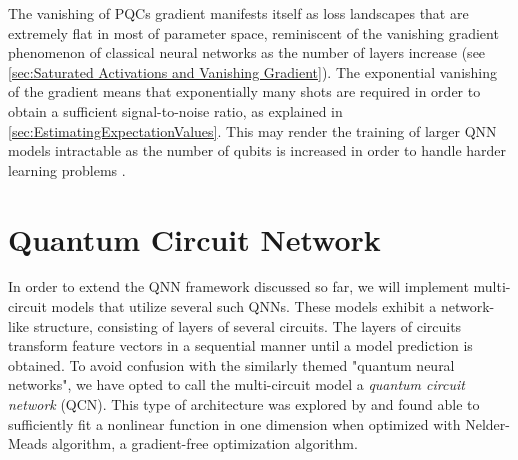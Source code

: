 The vanishing of PQCs gradient manifests itself as loss landscapes that are extremely flat in most of parameter space, reminiscent of the vanishing gradient phenomenon of classical neural networks as the number of layers increase (see \cref{sec:Saturated Activations and Vanishing Gradient}). The exponential vanishing of the gradient means that exponentially many shots are required in order to obtain a sufficient signal-to-noise ratio, as explained in \cref{sec:EstimatingExpectationValues}. This may render the training of larger QNN models intractable as the number of qubits is increased in order to handle harder learning problems \cite{skolik2020layerwise}.


\section{Quantum Circuit Network}\label{sec:Quantum Circuit Network}
In order to extend the QNN framework discussed so far, we will implement multi-circuit models that utilize several such QNNs. These models exhibit a network-like structure, consisting of layers of several circuits. The layers of circuits transform feature vectors in a sequential manner until a model prediction is obtained. To avoid confusion with the similarly themed "quantum neural networks", we have opted to call the multi-circuit model a \emph{quantum circuit network} (QCN). This type of architecture was explored by \citet{stian} and found able to sufficiently fit a nonlinear function in one dimension when optimized with Nelder-Meads algorithm, a gradient-free optimization algorithm.


